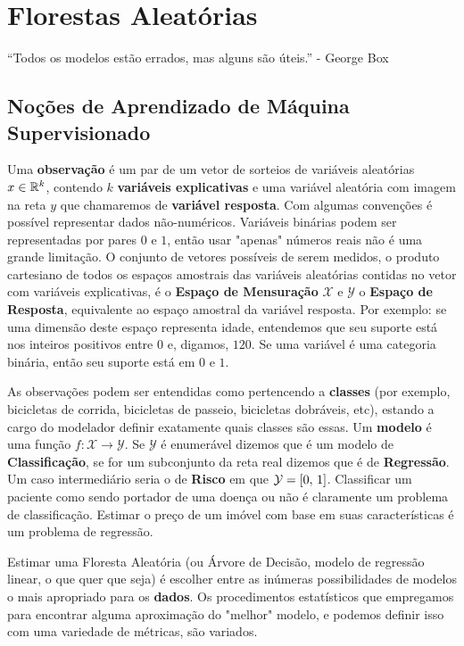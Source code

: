 
\chapter{Florestas Aleatórias}

\begin{citacao}
	``Todos os modelos estão errados, mas alguns são úteis.''  - George Box
\end{citacao}

\section{Noções de Aprendizado de Máquina Supervisionado}

Uma \textbf{observação} é um par de um vetor de sorteios de variáveis aleatórias $x \in \mathbb{R}^k$, contendo $k$ \textbf{variáveis explicativas} e uma variável aleatória com imagem na reta $y$ que chamaremos de \textbf{variável resposta}. Com algumas convenções é possível representar dados não-numéricos. Variáveis binárias podem ser representadas por pares $0$ e $1$, então usar "apenas" números reais não é uma grande limitação. O conjunto de vetores possíveis de serem medidos, o produto cartesiano de todos os espaços amostrais das variáveis aleatórias contidas no vetor com variáveis explicativas, é o \textbf{Espaço de Mensuração} $\mathcal{X}$ e $\mathcal{Y}$ o \textbf{Espaço de Resposta}, equivalente ao espaço amostral da variável resposta. Por exemplo: se uma dimensão deste espaço representa idade, entendemos que seu suporte está nos inteiros positivos entre $0$ e, digamos, $120$. Se uma variável é uma categoria binária, então seu suporte está em $0$ e $1$. 

As observações podem ser entendidas como pertencendo a \textbf{classes} (por exemplo, bicicletas de corrida, bicicletas de passeio, bicicletas dobráveis, etc), estando a cargo do modelador definir exatamente quais classes são essas. Um \textbf{modelo} é uma função $f: \mathcal{X} \to \mathcal{Y}$. Se $\mathcal{Y}$ é enumerável dizemos que é um modelo de \textbf{Classificação}, se for um subconjunto da reta real dizemos que é de \textbf{Regressão}. Um caso intermediário seria o de \textbf{Risco} em que $\mathcal{Y} = [0, \,1]$. Classificar um paciente como sendo portador de uma doença ou não é claramente um problema de classificação. Estimar o preço de um imóvel com base em suas características é um problema de regressão. 

Estimar uma Floresta Aleatória (ou Árvore de Decisão, modelo de regressão linear, o que quer que seja) é  escolher entre as inúmeras possibilidades de modelos o mais apropriado para os \textbf{dados}. Os procedimentos estatísticos que empregamos para encontrar alguma aproximação do "melhor" modelo, e podemos definir isso com uma variedade de métricas, são variados.

